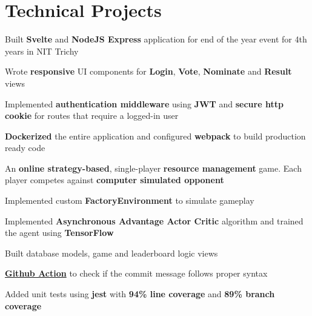 \documentclass[]{deedy-resume-openfont}
\begin{document}
\begin{minipage}[t]{0.69\textwidth}
\section{Technical Projects}

\begin{tightemize}
\item Built \textbf{Svelte} and \textbf{NodeJS Express} application for end of the year event for 4th years in NIT Trichy \item Wrote \textbf{responsive} UI components for \textbf{Login}, \textbf{Vote}, \textbf{Nominate} and \textbf{Result} views \item Implemented \textbf{authentication middleware} using \textbf{JWT} and \textbf{secure http cookie} for routes that require a logged-in user \item \textbf{Dockerized} the entire application and configured \textbf{webpack} to build production ready code
\end{tightemize}
\sectionsep

\begin{tightemize}
\item An \textbf{online strategy-based}, single-player \textbf{resource management} game. Each player competes against \textbf{computer simulated opponent} \item Implemented custom \textbf{FactoryEnvironment} to simulate gameplay  \item Implemented \textbf{Asynchronous Advantage Actor Critic} algorithm and trained the agent using \textbf{TensorFlow} \item Built database models, game and leaderboard logic views
\end{tightemize}
\sectionsep

\begin{tightemize}
\item \href{https://github.com/marketplace/actions/check-commit-message}{\textbf{Github Action}} to check if the commit message follows proper syntax \item Added unit tests using \textbf{jest} with \textbf{94\% line coverage} and \textbf{89\% branch coverage}
\end{tightemize}
\sectionsep


\end{minipage}
\end{document}
